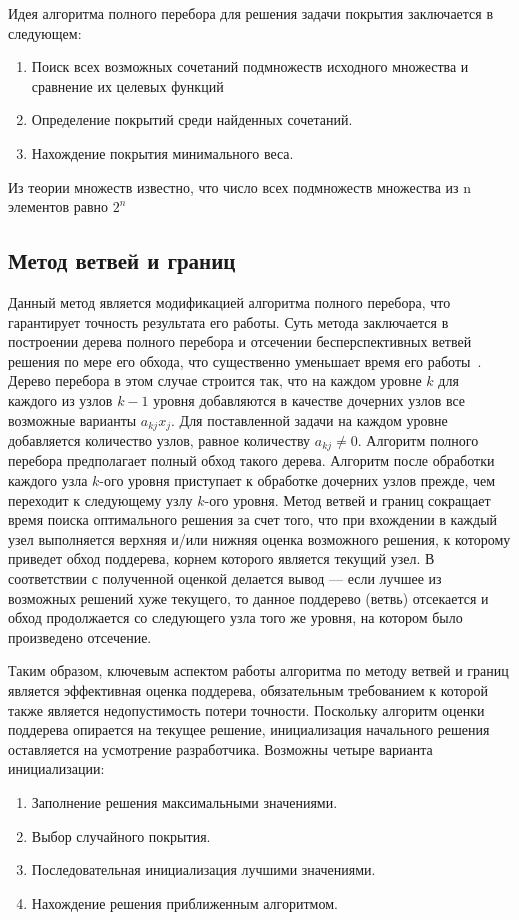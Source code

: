 Идея алгоритма полного перебора для решения задачи покрытия заключается в следующем:
\begin{enumerate}
	\item Поиск всех возможных сочетаний подмножеств исходного множества и сравнение их целевых функций
	\item Определение покрытий среди найденных сочетаний.
	\item Нахождение покрытия минимального веса.
\end{enumerate}

Из теории множеств известно, что число всех подмножеств множества из n элементов равно $2^n$

\subsection{Метод ветвей и границ}
 
Данный метод является модификацией алгоритма полного перебора, что гарантирует точность результата его работы. Суть метода заключается в построении дерева полного перебора и отсечении бесперспективных ветвей решения по мере его обхода, что существенно уменьшает время его работы~\cite{mvig_app}. 
Дерево перебора в этом случае строится так, что на каждом уровне $k$ для каждого из узлов $k-1$ уровня добавляются в качестве дочерних узлов все возможные варианты $a_{kj}x_j$. Для поставленной задачи на каждом уровне добавляется количество узлов, равное количеству $a_{kj}\ne0$. Алгоритм полного перебора предполагает полный обход такого дерева. Алгоритм после обработки каждого узла $k$-ого уровня приступает к обработке дочерних узлов прежде, чем переходит к следующему узлу $k$-ого уровня. Метод ветвей и границ сокращает время поиска оптимального решения за счет того, что при вхождении в каждый узел выполняется верхняя и/или нижняя оценка возможного решения, к которому приведет обход поддерева, корнем которого является текущий узел. В соответствии с полученной оценкой делается вывод --- если лучшее из возможных решений хуже текущего, то данное поддерево (ветвь) отсекается и обход продолжается со следующего узла того же уровня, на котором было произведено отсечение.

Таким образом, ключевым аспектом работы алгоритма по методу ветвей и границ является эффективная оценка поддерева, обязательным требованием к которой также является недопустимость потери точности. Поскольку алгоритм оценки поддерева опирается на текущее решение, инициализация начального решения оставляется на усмотрение разработчика. Возможны четыре варианта инициализации:
\begin{enumerate}
\item Заполнение решения максимальными значениями.
\item Выбор случайного покрытия.
\item Последовательная инициализация лучшими значениями.
\item Нахождение решения приближенным алгоритмом.
\end{enumerate}

